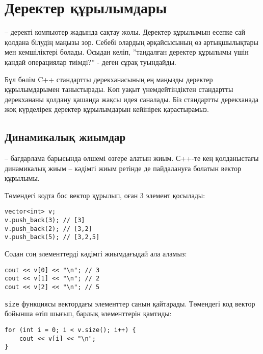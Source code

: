 \chapter{Деректер құрылымдары}


 -- деректі компьютер 
жадында сақтау жолы.
Деректер құрылымын есепке сай қолдана білудің маңызы зор.
Себебі олардың әрқайсысының өз артықшылықтары мен кемшіліктері болады.
Осыдан келіп, ''таңдалған деректер құрылымы үшін қандай
операциялар тиімді?'' - деген сұрақ туындайды.

Бұл бөлім C++ стандартты дерекханасының  
ең маңызды деректер құрылымдарымен таныстырады.
Көп уақыт үнемдейтіндіктен стандартты дерекхананы 
қолдану қашанда жақсы идея саналады.
Біз стандартты дерекханада жоқ күрделірек
деректер құрылымдарын кейінірек қарастырамыз.

\section{Динамикалық жиымдар}

 -- бағдарлама барысында
өлшемі өзгере алатын жиым.
С++-те кең қолданыстағы динамикалық жиым -- кәдімгі
жиым ретінде де пайдалануға болатын вектор құрылымы.

Төмендегі кодта бос вектор құрылып, оған 3 элемент 
қосылады:

\begin{lstlisting}
vector<int> v;
v.push_back(3); // [3]
v.push_back(2); // [3,2]
v.push_back(5); // [3,2,5]
\end{lstlisting}

Содан соң элементтерді кәдімгі жиымдағыдай ала аламыз:

\begin{lstlisting}
cout << v[0] << "\n"; // 3
cout << v[1] << "\n"; // 2
cout << v[2] << "\n"; // 5
\end{lstlisting}

\texttt{size} функциясы вектордағы элементтер санын қайтарады.
Төмендегі код вектор бойынша өтіп шығып, барлық элементтерін қамтиды:

\begin{lstlisting}
for (int i = 0; i < v.size(); i++) {
    cout << v[i] << "\n";
}
\end{lstlisting}

